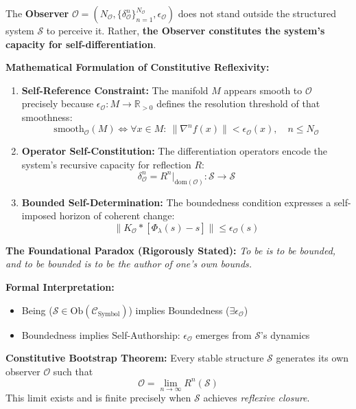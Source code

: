 \begin{tcolorbox}[title=Foundational Scholium — The Constitutive Reflex, colback=blue!5!white, colframe=blue!75!black, fonttitle=\bfseries]
\label{scholium:bk1_constitutive_reflex}
The \textbf{Observer} $\mathcal{O} = (N_\mathcal{O}, \{\delta^n_\mathcal{O}\}_{n=1}^{N_\mathcal{O}}, \epsilon_\mathcal{O})$ does not stand outside the structured system $\mathcal{S}$ to perceive it. Rather, \textbf{the Observer constitutes the system's capacity for self-differentiation}.

\textbf{Mathematical Formulation of Constitutive Reflexivity:}
\begin{enumerate}
\item \textbf{Self-Reference Constraint:} The manifold $M$ appears smooth to $\mathcal{O}$ precisely because $\epsilon_\mathcal{O}: M \to \mathbb{R}_{>0}$ defines the resolution threshold of that smoothness:
\[
\text{smooth}_\mathcal{O}(M) \iff \forall x \in M:\ \|\nabla^n f(x)\| < \epsilon_\mathcal{O}(x),\quad n \leq N_\mathcal{O}
\]

\item \textbf{Operator Self-Constitution:} The differentiation operators encode the system’s recursive capacity for reflection $R$:
\[
\delta^n_\mathcal{O} = R^n|_{\text{dom}(\mathcal{O})} : \mathcal{S} \to \mathcal{S}
\]

\item \textbf{Bounded Self-Determination:} The boundedness condition expresses a self-imposed horizon of coherent change:
\[
\|K_\mathcal{O} \ast [\Phi_\lambda(s) - s]\| \leq \epsilon_\mathcal{O}(s)
\]
\end{enumerate}

\textbf{The Foundational Paradox (Rigorously Stated):} \emph{To be is to be bounded, and to be bounded is to be the author of one’s own bounds.}

\textbf{Formal Interpretation:}
\begin{itemize}
\item Being ($\mathcal{S} \in \text{Ob}(\mathcal{C}_\text{Symbol})$) implies Boundedness ($\exists \epsilon_\mathcal{O}$)
\item Boundedness implies Self-Authorship: $\epsilon_\mathcal{O}$ emerges from $\mathcal{S}$’s dynamics
\end{itemize}

\textbf{Constitutive Bootstrap Theorem:} Every stable structure $\mathcal{S}$ generates its own observer $\mathcal{O}$ such that
\[
\mathcal{O} = \lim_{n \to \infty} R^n(\mathcal{S})
\]
This limit exists and is finite precisely when $\mathcal{S}$ achieves \emph{reflexive closure}.


\end{tcolorbox}
